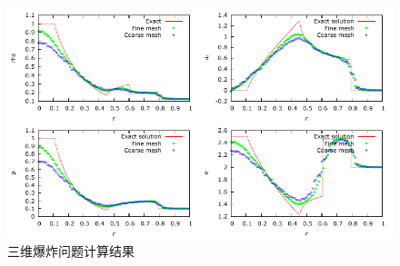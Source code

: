 \begin{figure}[htbp]
  \centering
  \includegraphics[scale=1.2]{./Pho/Chp4/3d_explosion_fine_multiplot.pdf}
  \caption{三维爆炸问题计算结果}
  \label{fig:3d-explosion-meshrefine-result}
\end{figure}
